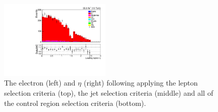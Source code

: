 \begin{figure}[h]
\includegraphics[width=0.47\textwidth]{figs/background-estimation/plots/unblinded/ttbar_control/lep1Eta_SingleTop_wMass_emu.pdf}
\caption{
The electron \pT (left) and $\eta$ (right) following applying the lepton selection criteria (top), the jet selection criteria (middle) and all of the \ttbar control region selection criteria (bottom).
}
\label{fig:ttbar_electron}
\end{figure}


